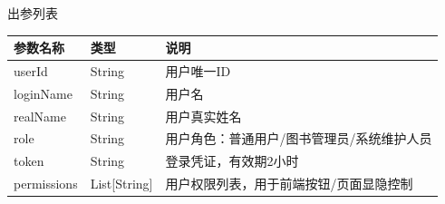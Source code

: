 \documentclass[12pt, a4paper]{article}
\begin{document}
\newpage
出参列表

\begin{table}[H]
    \centering
    \begin{tabular}{|l|l|l|}
        \hline
        参数名称 & 类型 & 说明 \\
        \hline
        userId & String & 用户唯一ID \\
        \hline
        loginName & String & 用户名 \\
        \hline
        realName & String & 用户真实姓名 \\
        \hline
        role & String & 用户角色：普通用户/图书管理员/系统维护人员 \\
        \hline
        token & String & 登录凭证，有效期2小时 \\
        \hline
        permissions & List[String] & 用户权限列表，用于前端按钮/页面显隐控制 \\
        \hline
    \end{tabular}
\end{table}
\end{document}
